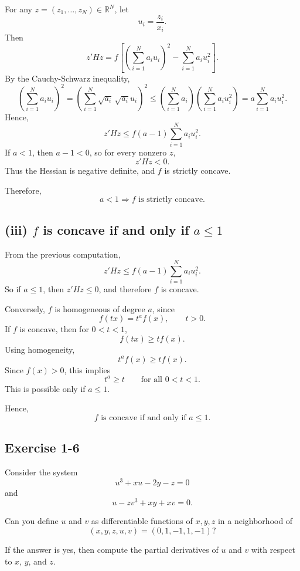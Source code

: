 For any \(z=(z_1,\dots,z_N)\in\mathbb{R}^N\), let
\[
u_i=\frac{z_i}{x_i}.
\]
Then
\[
z'H z
=
f\left[
\left(\sum_{i=1}^N a_i u_i\right)^2
-
\sum_{i=1}^N a_i u_i^2
\right].
\]
By the Cauchy-Schwarz inequality,
\[
\left(\sum_{i=1}^N a_i u_i\right)^2
=
\left(\sum_{i=1}^N \sqrt{a_i}\,\sqrt{a_i}u_i\right)^2
\le
\left(\sum_{i=1}^N a_i\right)\left(\sum_{i=1}^N a_i u_i^2\right)
=
a\sum_{i=1}^N a_i u_i^2.
\]
Hence,
\[
z'H z
\le
f(a-1)\sum_{i=1}^N a_i u_i^2.
\]
If \(a<1\), then \(a-1<0\), so for every nonzero \(z\),
\[
z'H z<0.
\]
Thus the Hessian is negative definite, and \(f\) is strictly concave.

Therefore,
\[
\boxed{a<1 \Rightarrow f \text{ is strictly concave.}}
\]

\subsection*{(iii) \(f\) is concave if and only if \(a\le 1\)}

From the previous computation,
\[
z'H z
\le
f(a-1)\sum_{i=1}^N a_i u_i^2.
\]
So if \(a\le 1\), then \(z'H z\le 0\), and therefore \(f\) is concave.

Conversely, \(f\) is homogeneous of degree \(a\), since
\[
f(tx)=t^a f(x), \qquad t>0.
\]
If \(f\) is concave, then for \(0<t<1\),
\[
f(tx)\ge t f(x).
\]
Using homogeneity,
\[
t^a f(x)\ge t f(x).
\]
Since \(f(x)>0\), this implies
\[
t^a\ge t \qquad \text{for all } 0<t<1.
\]
This is possible only if \(a\le 1\).

Hence,
\[
\boxed{f \text{ is concave if and only if } a\le 1.}
\]



\vspace{30pt}
\begin{tcolorbox}[breakable]

\subsection*{Exercise 1-6}

Consider the system
\[
u^3 + xu - 2y - z = 0
\]
and
\[
u - zv^3 + xy + xv = 0.
\]

Can you define $u$ and $v$ as differentiable functions of $x,y,z$
in a neighborhood of
\[
(x,y,z,u,v)=(0,1,-1,1,-1)?
\]

If the answer is yes, then compute the partial derivatives of
$u$ and $v$ with respect to $x$, $y$, and $z$.

\end{tcolorbox}


